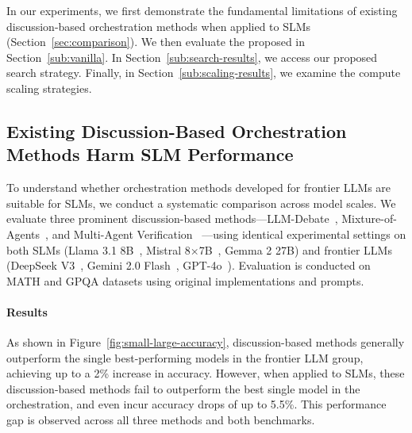 

In our experiments, we first demonstrate the fundamental limitations of existing discussion-based orchestration methods when applied to SLMs (Section~\ref{sec:comparison}). We then evaluate the proposed \NAME{} in Section~\ref{sub:vanilla}. In Section~\ref{sub:search-results}, we access our proposed search strategy. Finally, in Section~\ref{sub:scaling-results}, we examine the compute scaling strategies.

\vspace{3pt}
\subsection{Existing Discussion-Based Orchestration Methods Harm SLM Performance}
\vspace{3pt}
\label{sec:comparison}


To understand whether orchestration methods developed for frontier LLMs are suitable for SLMs, we conduct a systematic comparison across model scales. We evaluate three prominent discussion-based methods—LLM-Debate~\citep{du2023improvingfactualityreasoninglanguage}, Mixture-of-Agents~\citep{wang2024mixtureofagentsenhanceslargelanguage}, and Multi-Agent Verification~\citep{lifshitz2025multiagentverificationscalingtesttime} —using identical experimental settings on both SLMs (Llama 3.1 8B~\citep{jiang2024mixtralexperts}, Mistral 8×7B~\citep{grattafiori2024llama3herdmodels}, Gemma 2 27B) and frontier LLMs (DeepSeek V3~\citep{deepseekai2025deepseekv3technicalreport}, Gemini 2.0 Flash~\citep{google2025gemini2flash}, GPT-4o~\citep{openai2024gpt4ocard}). Evaluation is conducted on MATH and GPQA datasets using original implementations and prompts.


\paragraph{Results} As shown in Figure~\ref{fig:small-large-accuracy}, discussion-based methods generally outperform the single best-performing models in the frontier LLM group, achieving up to a 2\% increase in accuracy. However, when applied to SLMs, these discussion-based methods fail to outperform the best single model in the orchestration, and even incur accuracy drops of up to 5.5\%. This performance gap is observed across all three methods and both benchmarks. 

